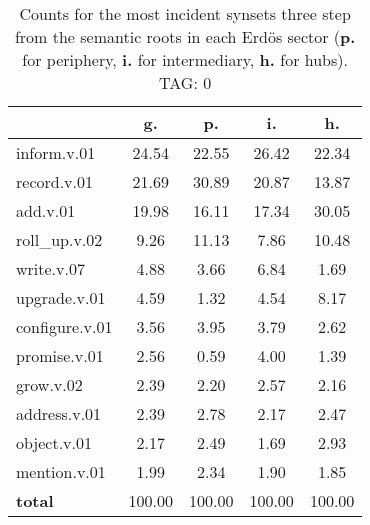 \begin{table}[h!]
\begin{center}
\begin{tabular}{| l || c | c | c | c |}\hline
 & {\bf g.} & {\bf p.} & {\bf i.} & {\bf h.} \\\hline\hline
inform.v.01 & 24.54  & 22.55  & 26.42  & 22.34 \\\hline
record.v.01 & 21.69  & 30.89  & 20.87  & 13.87 \\\hline
add.v.01 & 19.98  & 16.11  & 17.34  & 30.05 \\\hline
roll\_up.v.02 & 9.26  & 11.13  & 7.86  & 10.48 \\\hline
write.v.07 & 4.88  & 3.66  & 6.84  & 1.69 \\\hline
upgrade.v.01 & 4.59  & 1.32  & 4.54  & 8.17 \\\hline
configure.v.01 & 3.56  & 3.95  & 3.79  & 2.62 \\\hline
promise.v.01 & 2.56  & 0.59  & 4.00  & 1.39 \\\hline
grow.v.02 & 2.39  & 2.20  & 2.57  & 2.16 \\\hline
address.v.01 & 2.39  & 2.78  & 2.17  & 2.47 \\\hline
object.v.01 & 2.17  & 2.49  & 1.69  & 2.93 \\\hline
mention.v.01 & 1.99  & 2.34  & 1.90  & 1.85 \\\hline\hline
{{\bf total}} & 100.00  & 100.00  & 100.00  & 100.00 \\\hline
\end{tabular}
\caption{Counts for the most incident synsets three step from the semantic roots in each Erd\"os sector ({\bf p.} for periphery, {\bf i.} for intermediary, {\bf h.} for hubs). TAG: 0}
\end{center}
\end{table}